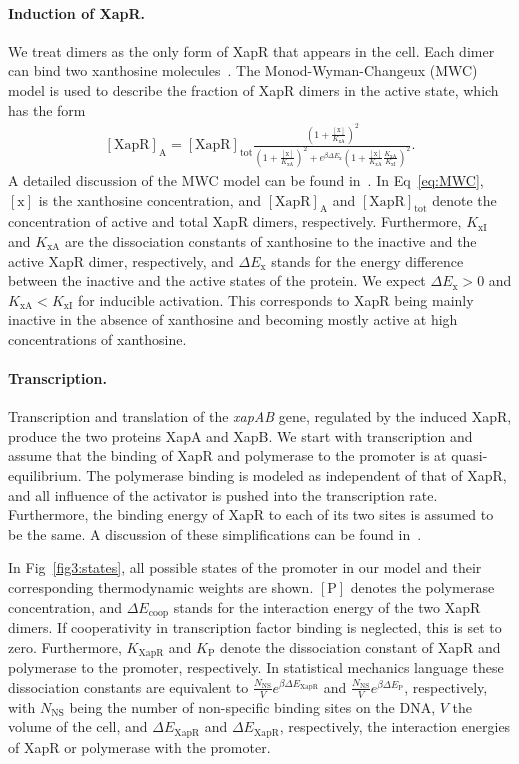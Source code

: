 \documentclass[10pt,letterpaper]{article}
\newcommand{\n}[1]{\mathrm{#1}}
\begin{document}
	\paragraph*{Induction of XapR.} 
	We treat dimers as the only form of XapR that appears in the cell. Each
	dimer can bind two xanthosine molecules~\cite{Joergensen1999}. The Monod-Wyman-Changeux (MWC)
	model is used to describe the fraction of XapR dimers in the active state,
	which has the form
	\begin{eqnarray}
	\label{eq:MWC}
	\n{[XapR]_A} = \n{[XapR]_{tot}} \frac{\left(1 + \frac{\n{[x]}}{K_{\n{xA}}}\right)^2}{\left(1 + \frac{\n{[x]}}{K_{\n{xA}}}\right)^2 + e^{\beta \Delta E_{\n{x}}} \left(1+\frac{\n{[x]}}{K_{\n{xA}}} \frac{K_{\n{xA}}}{K_{\n{xI}}}\right)^2}.
	\end{eqnarray}
	A detailed discussion of the
	MWC model can be found in~\cite{Marzen2013}. In Eq~\ref{eq:MWC},
	$\n{[x]}$ is the xanthosine concentration, and $\n{[XapR]_A}$ and
	$\n{[XapR]_{tot}}$ denote the concentration of active and total XapR dimers,
	respectively. Furthermore, $K_{\n{xI}}$ and $K_{\n{xA}}$ are the
	dissociation constants of xanthosine to the inactive and the active XapR
	dimer, respectively, and $\Delta E_{\n{x}}$ stands for the energy difference
	between the inactive and the active states of the protein. We expect $\Delta E_{\n{x}} > 0$
	and $K_{\n{xA}} < K_{\n{xI}}$ for inducible activation. This corresponds to
	XapR being mainly inactive in the absence of xanthosine and becoming mostly
	active at high concentrations of xanthosine. 
	
	\paragraph*{Transcription.}
	Transcription and translation of the \emph{xapAB} gene, regulated by the
	induced XapR, produce the two proteins XapA and XapB. We start with
	transcription and assume that the binding of XapR and polymerase to the
	promoter is at quasi-equilibrium. The polymerase binding is modeled as
	independent of that of XapR, and all influence of the activator is pushed
	into the transcription rate. Furthermore, the binding energy of XapR to each
	of its two sites is assumed to be the same. A discussion of these
	simplifications can be found in~.
	
	In Fig~\ref{fig3:states}, all possible states of the promoter in our model
	and their corresponding thermodynamic weights are shown. $\n{[P]}$
	denotes the polymerase concentration, and $\Delta E_{\n{coop}}$ stands for
	the interaction energy of the two XapR dimers. If cooperativity in
	transcription factor binding is neglected, this is set to zero. Furthermore,
	$K_{\n{XapR}}$ and $K_{\n{P}}$ denote the dissociation constant of XapR and
	polymerase to the promoter, respectively. In statistical mechanics language
	these dissociation constants are equivalent to
	$\frac{N_{\n{NS}}}{V} e^{\beta \Delta E_{\n{XapR}}}$
	and $\frac{N_{\n{NS}}}{V} e^{\beta \Delta E_{\n{P}}}$, respectively,
	with $N_{\mathrm{NS}}$ being the number of non-specific binding sites on the
	DNA, $V$ the volume of the cell, and $\Delta E_{\n{XapR}}$ and
	$\Delta E_{\n{XapR}}$, respectively, the interaction energies
	of XapR or polymerase with the promoter.
	
\end{document}

